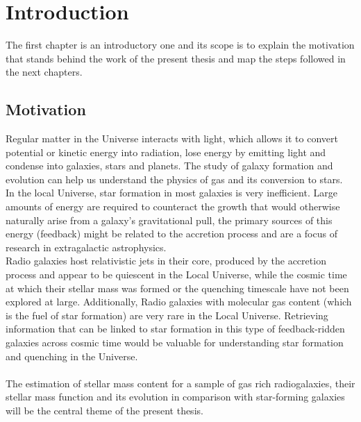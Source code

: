 \chapter{Introduction}
\label{chp:intro}
\captionsetup{width=0.75\textwidth}

The first chapter is an introductory one and its scope is to explain the motivation that stands behind the work of the present thesis and map the steps followed in the next chapters.

\section{Motivation}

Regular matter in the Universe interacts with light, which allows it to convert potential or kinetic energy into radiation, lose energy by emitting light and condense into galaxies, stars and planets. The study of galaxy formation and evolution can help us understand the physics of gas and its conversion to stars.\\
In the local Universe, star formation in most galaxies is very inefficient. Large amounts of energy are required to counteract the growth that would otherwise naturally arise from a galaxy's gravitational pull, the primary sources of this energy (feedback) might be related to the accretion process and are a focus of research in extragalactic astrophysics.\\
Radio galaxies host relativistic jets in their core, produced by the accretion process and appear to be quiescent in the Local Universe\cite{Best2005}, while the cosmic time at which their stellar mass was formed or the quenching timescale have not been explored at large. Additionally, Radio galaxies with molecular gas content (which is the fuel of star formation) are very rare in the Local Universe. Retrieving information that can be linked to star formation in this type of feedback-ridden galaxies across cosmic time would be valuable for understanding star formation and quenching in the Universe. \\ \\
The estimation of stellar mass content for a sample of gas rich radiogalaxies, their stellar mass function and its evolution in comparison with star-forming galaxies will be the central theme of the present thesis.

